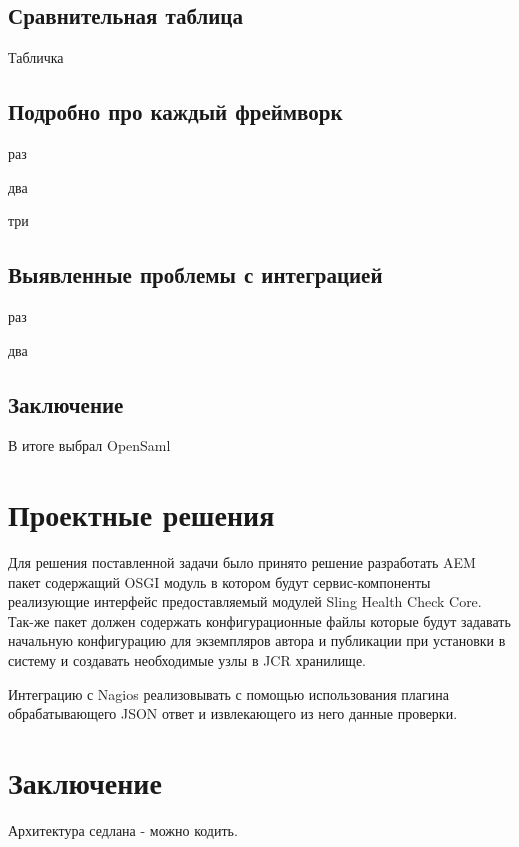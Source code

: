 \subsection{Сравнительная таблица}
Табличка

\subsection{Подробно про каждый фреймворк}
раз

два

три

\subsection{Выявленные проблемы с интеграцией}
раз

два

\subsection{Заключение}
В итоге выбрал OpenSaml

\section{Проектные решения}
Для решения поставленной задачи было принято решение разработать AEM пакет содержащий OSGI модуль в котором будут сервис-компоненты реализующие интерфейс предоставляемый модулей Sling Health Check Core. Так-же пакет должен содержать конфигурационные файлы которые будут задавать начальную конфигурацию для экземпляров автора и публикации при установки в систему и создавать необходимые узлы в JCR хранилище.

Интеграцию с Nagios реализовывать с помощью использования плагина обрабатывающего JSON ответ и извлекающего из него данные проверки.

\section{Заключение}
Архитектура седлана - можно кодить.

